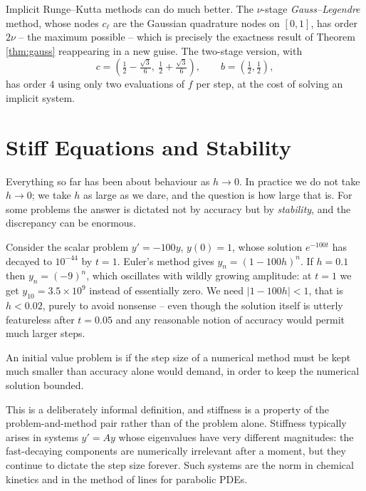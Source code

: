 \documentclass[a4paper]{scrartcl}
\providecommand{\abs}[1]{\left\lvert#1\right\rvert}
\renewcommand{\abs}[1]{\left\lvert#1\right\rvert}
\begin{document}
\begin{remark}
  Implicit Runge--Kutta methods can do much better. The $\nu$-stage \emph{Gauss--Legendre} method, whose nodes $c_\ell$ are the Gaussian quadrature nodes on $[0,1]$, has order $2\nu$ -- the maximum possible -- which is precisely the exactness result of Theorem \ref{thm:gauss} reappearing in a new guise. The two-stage version, with
  $$
  c = \left(\tfrac12 - \tfrac{\sqrt3}{6},\ \tfrac12 + \tfrac{\sqrt3}{6}\right), \qquad b = \left(\tfrac12, \tfrac12\right),
  $$
  has order $4$ using only two evaluations of $f$ per step, at the cost of solving an implicit system.
\end{remark}


\section{Stiff Equations and Stability}\label{sec:stiff}

Everything so far has been about behaviour as $h \to 0$. In practice we do not take $h \to 0$; we take $h$ as large as we dare, and the question is how large that is. For some problems the answer is dictated not by accuracy but by \emph{stability}, and the discrepancy can be enormous.

\begin{example}
  Consider the scalar problem $y' = -100y$, $y(0) = 1$, whose solution $e^{-100t}$ has decayed to $10^{-44}$ by $t = 1$. Euler's method gives $y_n = (1-100h)^n$. If $h = 0.1$ then $y_n = (-9)^n$, which oscillates with wildly growing amplitude: at $t=1$ we get $y_{10} = 3.5\times 10^{9}$ instead of essentially zero. We need $\abs{1 - 100h} < 1$, that is $h < 0.02$, purely to avoid nonsense -- even though the solution itself is utterly featureless after $t = 0.05$ and any reasonable notion of accuracy would permit much larger steps.
\end{example}

\begin{definition}[Stiffness]
  An initial value problem is  if the step size of a numerical method must be kept much smaller than accuracy alone would demand, in order to keep the numerical solution bounded.
\end{definition}

This is a deliberately informal definition, and stiffness is a property of the problem-and-method pair rather than of the problem alone. Stiffness typically arises in systems $y' = Ay$ whose eigenvalues have very different magnitudes: the fast-decaying components are numerically irrelevant after a moment, but they continue to dictate the step size forever. Such systems are the norm in chemical kinetics and in the method of lines for parabolic PDEs.
\end{document}
